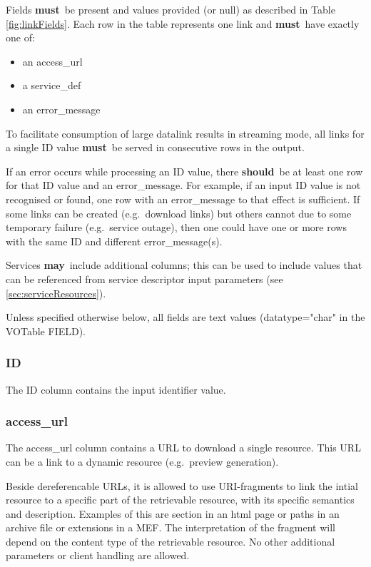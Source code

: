 \documentclass[11pt,a4paper]{ivoa}
\newcommand{\attval}[2]{#1={\allowbreak}{"}#2{"}}
\newcommand{\rfcmust}{\textbf{must}}
\newcommand{\rfcshould}{\textbf{should}}
\newcommand{\rfcmay}{\textbf{may}}
\begin{document}
Fields \rfcmust\ be present and values provided
(or null) as described in Table \ref{fig:linkFields}. Each row in the table
represents one link and \rfcmust\ have exactly one of:
\begin{itemize}
  \item an access\_url
  \item a service\_def
  \item an error\_message
\end{itemize}

To facilitate consumption of large datalink results in streaming mode, all links
for a single ID value \rfcmust\ be served in consecutive rows in the output.

If an error occurs while processing an ID value, there \rfcshould\ be at least
one row for that ID value and an error\_message. For example, if an input
ID value is not recognised or found, one row with an error\_message
to that effect is sufficient.
If some links can be created (e.g.\ download links)
but others cannot due to some temporary failure (e.g.\ service outage),
then one could have one or more rows with the same ID and different
error\_message(s).

Services \rfcmay\ include additional columns; this can be used to include
values that can be referenced from service descriptor input parameters
(see \ref{sec:serviceResources}).

Unless specified otherwise below, all fields are text values (\attval{datatype}{char}
in the VOTable FIELD).

\subsubsection{ID}

The ID column contains the input identifier value.


\subsubsection{access\_url}

The access\_url column contains a URL to download a single resource.
This URL can be a link to a dynamic resource (e.g.\ preview generation).

Beside dereferencable URLs, it is allowed to use URI-fragments to link
the intial resource to a specific part of the retrievable resource, with
its specific semantics and description. Examples of this are section
in an html page or paths in an archive file or extensions in a MEF.
The interpretation of the fragment will depend on the content type
of the retrievable resource.  No other additional parameters or client
handling are allowed.
\end{document}
